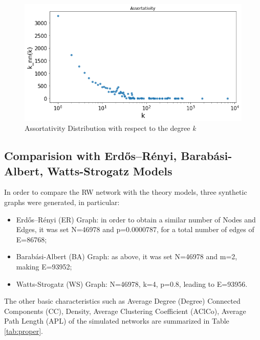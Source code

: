\documentclass[sigchi]{acmart}
\begin{document}
\begin{figure}[h]
    \centering
    \includegraphics[width=\columnwidth]{report/img/Assortativity_distribution.png}
    \caption{Assortativity Distribution with respect to the degree \textit{k}}
    \label{fig:assortativity}
\end{figure}

\subsection{Comparision with Erdős–Rényi, Barabási-Albert, Watts-Strogatz Models}

In order to compare the RW network with the theory models, three synthetic graphs were generated, in particular:
\begin{itemize}
    \item Erdős–Rényi (ER) Graph\cite{erdos}: in order to obtain a similar number of Nodes and Edges, it was set N=46978 and p=0.0000787, for a total number of edges of E=86768;
    \item Barabási-Albert (BA) Graph\cite{barabasi}: as above, it was set N=46978 and m=2, making E=93952;
    \item Watts-Strogatz (WS) Graph\cite{watts}: N=46978, k=4, p=0.8, leading to E=93956.
\end{itemize}

The other basic characteristics such as Average Degree (Degree) Connected Components (CC), Density, Average Clustering Coefficient (AClCo), Average Path Length (APL) of the simulated networks are summarized in Table \ref{tab:proper}. 
\end{document}
